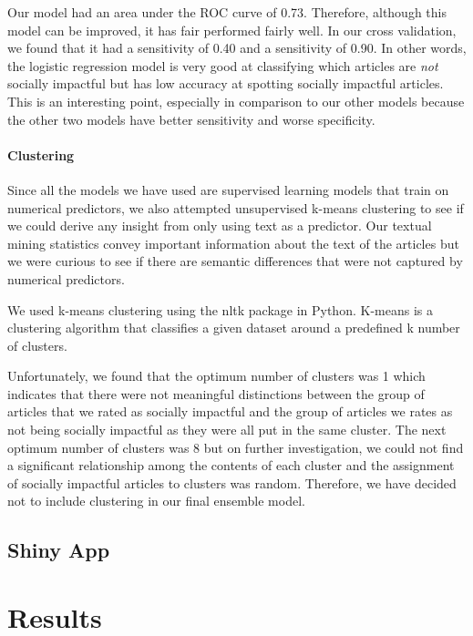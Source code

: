 \documentclass[10pt,letterpaper]{article}
\begin{document}
Our model had an area under the ROC curve of 0.73. Therefore, although
this model can be improved, it has fair performed fairly well. In our
cross validation, we found that it had a sensitivity of 0.40 and a
sensitivity of 0.90. In other words, the logistic regression model is
very good at classifying which articles are \emph{not} socially
impactful but has low accuracy at spotting socially impactful articles.
This is an interesting point, especially in comparison to our other
models because the other two models have better sensitivity and worse
specificity.

\hypertarget{clustering}{%
\paragraph{Clustering}\label{clustering}}

Since all the models we have used are supervised learning models that
train on numerical predictors, we also attempted unsupervised k-means
clustering to see if we could derive any insight from only using text as
a predictor. Our textual mining statistics convey important information
about the text of the articles but we were curious to see if there are
semantic differences that were not captured by numerical predictors.

We used k-means clustering using the nltk package in Python. K-means is
a clustering algorithm that classifies a given dataset around a
predefined k number of clusters.

Unfortunately, we found that the optimum number of clusters was 1 which
indicates that there were not meaningful distinctions between the group
of articles that we rated as socially impactful and the group of
articles we rates as not being socially impactful as they were all put
in the same cluster. The next optimum number of clusters was 8 but on
further investigation, we could not find a significant relationship
among the contents of each cluster and the assignment of socially
impactful articles to clusters was random. Therefore, we have decided
not to include clustering in our final ensemble model.

\subsection{Shiny App}\label{shiny-app}
\hypertarget{results}{%
\section{Results}\label{results}}
\end{document}

